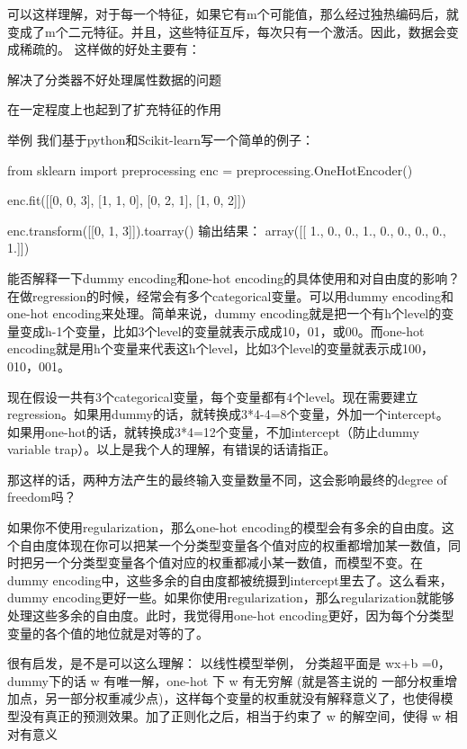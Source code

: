 \documentclass[10pt,a4paper]{ctexbook}
\begin{document}
可以这样理解，对于每一个特征，如果它有m个可能值，那么经过独热编码后，就变成了m个二元特征。并且，这些特征互斥，每次只有一个激活。因此，数据会变成稀疏的。
这样做的好处主要有：

解决了分类器不好处理属性数据的问题

在一定程度上也起到了扩充特征的作用

举例
我们基于python和Scikit-learn写一个简单的例子：

from sklearn import preprocessing
enc = preprocessing.OneHotEncoder()

enc.fit([[0, 0, 3], [1, 1, 0], [0, 2, 1], [1, 0, 2]])

enc.transform([[0, 1, 3]]).toarray()
输出结果：
array([[ 1.,  0.,  0.,  1.,  0.,  0.,  0.,  0.,  1.]])







能否解释一下dummy encoding和one-hot encoding的具体使用和对自由度的影响？
在做regression的时候，经常会有多个categorical变量。可以用dummy encoding和one-hot encoding来处理。简单来说，dummy encoding就是把一个有h个level的变量变成h-1个变量，比如3个level的变量就表示成成10，01，或00。而one-hot encoding就是用h个变量来代表这h个level，比如3个level的变量就表示成100，010，001。


现在假设一共有3个categorical变量，每个变量都有4个level。现在需要建立regression。如果用dummy的话，就转换成3*4-4=8个变量，外加一个intercept。如果用one-hot的话，就转换成3*4=12个变量，不加intercept（防止dummy variable trap）。以上是我个人的理解，有错误的话请指正。

那这样的话，两种方法产生的最终输入变量数量不同，这会影响最终的degree of freedom吗？




如果你不使用regularization，那么one-hot encoding的模型会有多余的自由度。这个自由度体现在你可以把某一个分类型变量各个值对应的权重都增加某一数值，同时把另一个分类型变量各个值对应的权重都减小某一数值，而模型不变。在dummy encoding中，这些多余的自由度都被统摄到intercept里去了。这么看来，dummy encoding更好一些。如果你使用regularization，那么regularization就能够处理这些多余的自由度。此时，我觉得用one-hot encoding更好，因为每个分类型变量的各个值的地位就是对等的了。


很有启发，是不是可以这么理解：
以线性模型举例， 分类超平面是 wx+b =0，dummy下的话 w 有唯一解，one-hot 下 w 有无穷解 (就是答主说的 一部分权重增加点，另一部分权重减少点)，这样每个变量的权重就没有解释意义了，也使得模型没有真正的预测效果。加了正则化之后，相当于约束了 w 的解空间，使得 w 相对有意义
\end{document}
